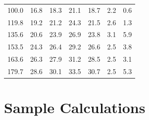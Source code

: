 \documentclass[index]{subfiles}
\begin{document}
\begin{table}[H]
\begin{tabular}{@{}ccccccc@{}}
        100.0            & 16.8                             & 18.3    & 21.1    & 18.7            & 2.2            & 0.6            \\
        119.8            & 19.2                             & 21.2    & 24.3    & 21.5            & 2.6            & 1.3            \\
        135.6            & 20.6                             & 23.9    & 26.9    & 23.8            & 3.1            & 5.9            \\
        153.5            & 24.3                             & 26.4    & 29.2    & 26.6            & 2.5            & 3.8            \\
        163.6            & 26.3                             & 27.9    & 31.2    & 28.5            & 2.5            & 3.1            \\
        179.7            & 28.6                             & 30.1    & 33.5    & 30.7            & 2.5            & 5.3
    \end{tabular}
\end{table}

\section{Sample Calculations}
\end{document}
